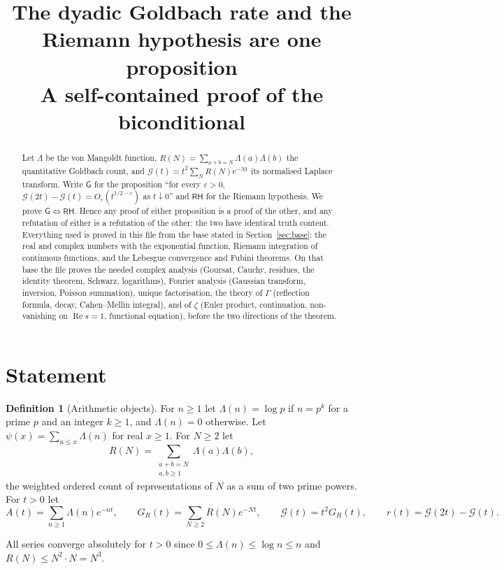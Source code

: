 \documentclass[11pt]{article}
\title{The dyadic Goldbach rate and the Riemann hypothesis are one proposition\\
\large A self-contained proof of the biconditional}
\author{}
\date{}
\theoremstyle{definition}
\newtheorem{definition}[theorem]{Definition}
\newcommand{\Lam}{\Lambda}
\newcommand{\re}{\operatorname{Re}}
\newcommand{\G}{\mathcal{G}}
\newcommand{\RH}{\mathsf{RH}}
\newcommand{\GR}{\mathsf{G}}
\begin{document}
\maketitle

\begin{abstract}
\noindent
Let $\Lam$ be the von Mangoldt function, $R(N)=\sum_{a+b=N}\Lam(a)\Lam(b)$ the quantitative Goldbach count, and
$\G(t)=t^{2}\sum_{N}R(N)e^{-Nt}$ its normalised Laplace transform.
Write $\GR$ for the proposition
``for every $\varepsilon>0$, $\G(2t)-\G(t)=O_\varepsilon(t^{1/2-\varepsilon})$ as $t\downarrow 0$''
and $\RH$ for the Riemann hypothesis.
We prove $\GR\Leftrightarrow\RH$.
Hence any proof of either proposition is a proof of the other, and any refutation of either is a refutation of the other: the two have identical truth content.
Everything used is proved in this file from the base stated in Section~\ref{sec:base}: the real and complex numbers with the exponential function, Riemann integration of continuous functions, and the Lebesgue convergence and Fubini theorems.
On that base the file proves the needed complex analysis (Goursat, Cauchy, residues, the identity theorem, Schwarz, logarithms), Fourier analysis (Gaussian transform, inversion, Poisson summation), unique factorisation, the theory of $\Gamma$ (reflection formula, decay, Cahen--Mellin integral), and of $\zeta$ (Euler product, continuation, non-vanishing on $\re s=1$, functional equation), before the two directions of the theorem.
\end{abstract}

\section{Statement}\label{sec:statement}

\begin{definition}[Arithmetic objects]
For $n\ge 1$ let $\Lam(n)=\log p$ if $n=p^{k}$ for a prime $p$ and an integer $k\ge 1$, and $\Lam(n)=0$ otherwise.
Let $\psi(x)=\sum_{n\le x}\Lam(n)$ for real $x\ge 1$.
For $N\ge 2$ let
\[
R(N)=\sum_{\substack{a+b=N\\ a,b\ge 1}}\Lam(a)\Lam(b),
\]
the weighted ordered count of representations of $N$ as a sum of two prime powers.
For $t>0$ let
\[
A(t)=\sum_{n\ge 1}\Lam(n)e^{-nt},\qquad
G_R(t)=\sum_{N\ge 2}R(N)e^{-Nt},\qquad
\G(t)=t^{2}G_R(t),\qquad
r(t)=\G(2t)-\G(t).
\]
\end{definition}

All series converge absolutely for $t>0$ since $0\le\Lam(n)\le\log n\le n$ and $R(N)\le N^{2}\cdot N=N^{3}$.
\end{document}
